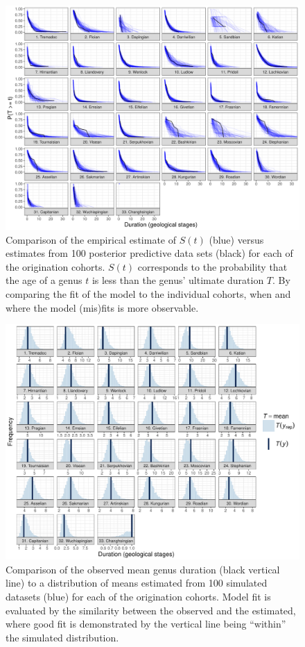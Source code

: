 \documentclass[11pt]{article}
\begin{document}
\begin{figure}[ht]
  \centering
  \includegraphics[height = 0.5\textheight,width=\textwidth,keepaspectratio=true]{figure/ppc_surv_coh}
  \caption{Comparison of the empirical estimate of \(S(t)\) (blue) versus estimates from 100 posterior predictive data sets (black) for each of the origination cohorts. \(S(t)\) corresponds to the probability that the age of a genus \(t\) is less than the genus' ultimate duration \(T\). By comparing the fit of the model to the individual cohorts, when and where the model (mis)fits is more observable. }
  \label{fig:surv_group}
\end{figure}

\begin{figure}[ht]
  \centering
  \includegraphics[height = 0.5\textheight,width=\textwidth,keepaspectratio=true]{figure/ppc_mean_group_cweib_cens}
  \caption{ Comparison of the observed mean genus duration (black vertical line) to a distribution of means estimated from 100 simulated datasets (blue) for each of the origination cohorts. Model fit is evaluated by the similarity between the observed and the estimated, where good fit is demonstrated by the vertical line being ``within'' the simulated distribution. }
  \label{fig:group_mean}
\end{figure}
\end{document}
